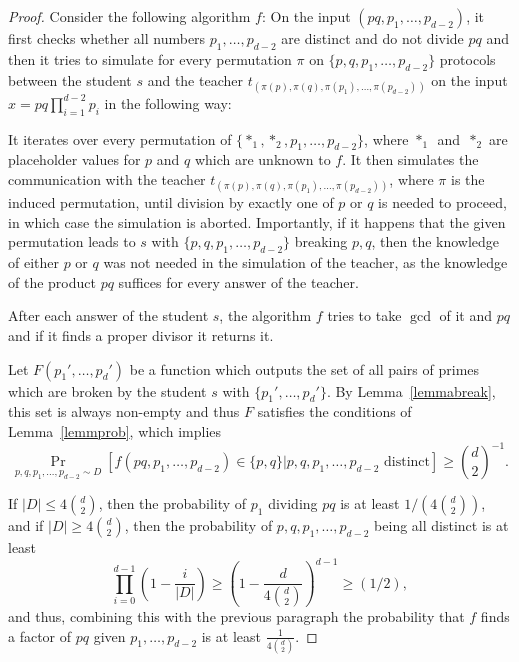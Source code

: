 \documentclass[10pt,a4paper]{amsart}
\newcommand{\abs}[1]{\lvert #1\rvert}
\begin{document}
\begin{proof}


    Consider the following algorithm $f$: On the input $(pq,p_1,\dots,p_{d-2})$, it first checks whether all numbers $p_1,\dots,p_{d-2}$ are distinct and do not divide $pq$ and then it tries to simulate for every permutation $\pi$ on $\{p,q,p_1,\dots,p_{d-2}\}$ protocols between the student $s$ and the teacher $t_{(\pi(p),\pi(q),\pi(p_1),\dots,\pi(p_{d-2}))}$ on the input $x=pq\prod_{i=1}^{d-2}p_i$ in the following way:
        
        It iterates over every permutation of $\{*_1,*_2, p_1,\dots,p_{d-2}\}$, where $*_1$~and~$*_2$ are placeholder values for $p$ and $q$ which are unknown to $f$. It then simulates the communication with the teacher $t_{(\pi(p),\pi(q),\pi(p_1),\dots,\pi(p_{d-2}))}$, where $\pi$ is the induced permutation, until division by exactly one of $p$ or $q$ is needed to proceed, in which case the simulation is aborted. Importantly, if it happens that the given permutation leads to $s$ with $\{p,q,p_1,\dots,p_{d-2}\}$ breaking $p,q$, then the knowledge of either $p$ or $q$ was not needed in the simulation of the teacher, as the knowledge of the product $pq$ suffices for every answer of the teacher. 
        
        After each answer of the student $s$, the algorithm $f$ tries to take $\gcd$ of it and $pq$ and if it finds a proper divisor it returns it.

    Let $F(p_1',\dots,p_d')$ be a function which outputs the set of all pairs of primes which are broken by the student $s$ with $\{p_1',\dots,p_d'\}$. By Lemma~\ref{lemmabreak}, this set is always non-empty and thus $F$ satisfies the conditions of Lemma~\ref{lemmprob}, which implies 
    \[\Pr_{p,q,p_1,\dots,p_{d-2}\sim D}[f(pq,p_1,\dots,p_{d-2})\in\{p,q\}|p,q,p_1,\dots,p_{d-2}\text{ distinct}]\geq \binom{d}{2}^{-1}.\]

    If $\abs{D}\leq 4 \binom{d}{2}$, then the probability of $p_1$ dividing $pq$ is at least $1/(4\binom{d}{2})$, and if $\abs{D}\geq 4\binom{d}{2}$, then the probability of $p,q,p_1,\dots,p_{d-2}$ being all distinct is at least \[\prod_{i=0}^{d-1} \left(1-\frac{i}{\abs{D}}\right ) \geq \left(1- \frac{d}{4 \binom{d}{2}}\right)^{d-1} \geq (1/2),\]
    and thus, combining this with the previous paragraph the probability that $f$ finds a factor of $pq$ given $p_1,\dots, p_{d-2}$ is at least $\frac{1}{4\binom{d}{2}}$.
\end{proof}
\end{document}
